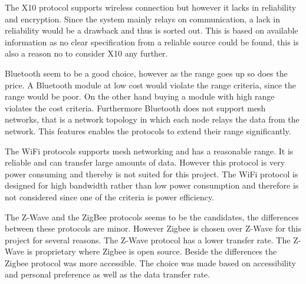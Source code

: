 The X10 protocol supports wireless connection but however it lacks in reliability and encryption. Since the system mainly relays on communication, a lack in reliability would be a drawback and thus is sorted out. This is based on available information as no clear specification from a reliable source could be found, this is also a reason no to consider X10 any further.


Bluetooth seem to be a good choice, however as the range goes up so does the price. A Bluetooth module at low cost would violate the range criteria, since the range would be poor. On the other hand buying a module with high range violates the cost criteria. Furthermore Bluetooth does not support mesh networks, that is a network topology in which each node relays the data from the network. This features enables the protocols to extend their range significantly. 


The WiFi protocols supports mesh networking and has a reasonable range. It is reliable and can transfer large amounts of data. However this protocol is very power consuming and thereby is not suited for this project. The WiFi protocol is designed for high bandwidth rather than low power consumption and therefore is not considered since one of the criteria is power efficiency.  


The Z-Wave and the ZigBee protocols seems to be the candidates, the differences between these protocols are minor. However Zigbee is chosen over Z-Wave for this project for several reasons. The Z-Wave protocol has a lower transfer rate. The Z-Wave is proprietary where Zigbee is open source. Beside the differences the Zigbee protocol was more accessible. The choice was made based on accessibility and personal preference as well as the data transfer rate.
